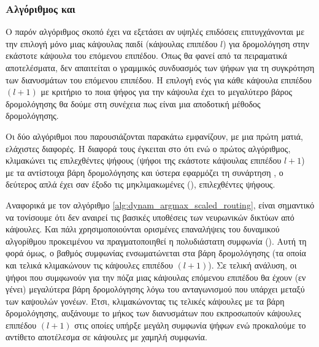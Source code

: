 \subsubsection{Αλγόριθμος  και }

Ο παρόν αλγόριθμος σκοπό έχει να εξετάσει αν υψηλές επιδόσεις επιτυγχάνονται με την επιλογή μόνο μιας κάψουλας παιδί (κάψουλας επιπέδου $l$) για δρομολόγηση στην εκάστοτε κάψουλα του επόμενου επιπέδου. Όπως θα φανεί από τα πειραματικά αποτελέσματα, δεν απαιτείται ο γραμμικός συνδυασμός των ψήφων για τη συγκρότηση των διανυσμάτων του επόμενου επιπέδου. Η επιλογή ενός  για κάθε κάψουλα επιπέδου $(l+1)$ με κριτήριο το ποια ψήφος για την κάψουλα έχει το μεγαλύτερο βάρος δρομολόγησης θα δούμε στη συνέχεια πως είναι μια αποδοτική μέθοδος δρομολόγησης.\par

Οι δύο αλγόριθμοι που παρουσιάζονται παρακάτω εμφανίζουν, με μια πρώτη ματιά, ελάχιστες διαφορές. Η διαφορά τους έγκειται στο ότι ενώ ο πρώτος αλγόριθμος, κλιμακώνει τις επιλεχθέντες ψήφους (ψήφοι  της εκάστοτε κάψουλας επιπέδου $l+1$) με τα αντίστοιχα βάρη δρομολόγησης και ύστερα εφαρμόζει τη συνάρτηση , ο δεύτερος απλά έχει σαν έξοδο τις μη\textendash κλιμακωμένες (), επιλεχθέντες ψήφους. \par

Αναφορικά με τον αλγόριθμο \ref{alg:dynam_argmax_scaled_routing}, είναι σημαντικό να τονίσουμε ότι δεν αναιρεί τις βασικές υποθέσεις των νευρωνικών δικτύων από κάψουλες. Και πάλι χρησιμοποιούνται ορισμένες επαναλήψεις του δυναμικού αλγορίθμου προκειμένου να πραγματοποιηθεί η πολυδιάστατη συμφωνία (). Αυτή τη φορά όμως, ο βαθμός συμφωνίας ενσωματώνεται στα βάρη δρομολόγησης (τα οποία και τελικά κλιμακώνουν τις κάψουλες επιπέδου $(l+1)$). Σε τελική ανάλυση, οι ψήφοι που συμφωνούν για την πόζα μιας κάψουλας επόμενου επιπέδου θα έχουν (εν γένει) μεγαλύτερα βάρη δρομολόγησης λόγω του ανταγωνισμού που υπάρχει μεταξύ των καψουλών γονέων. Έτσι, κλιμακώνοντας τις τελικές κάψουλες με τα βάρη δρομολόγησης, αυξάνουμε το μήκος των διανυσμάτων που εκπροσωπούν κάψουλες επιπέδου $(l+1)$ στις οποίες υπήρξε μεγάλη συμφωνία ψήφων ενώ προκαλούμε το αντίθετο αποτέλεσμα σε κάψουλες με χαμηλή συμφωνία.\par

